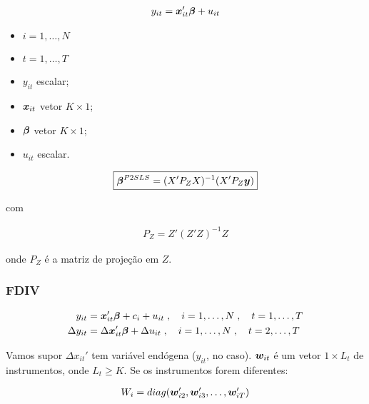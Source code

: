 \documentclass[11pt, oneside, a4paper, article]{article}
\numberwithin{equation}{section}
\begin{document}
\begin{description}
\vspace{-1 em}
\begin{align*}
	y_{it} = \boldsymbol{x}_{it}' \boldsymbol{\beta} + u_{it}
\end{align*}

\begin{itemize}\itemsep0pt
\item $i = 1, \dots, N$
\item $t = 1, \dots, T$
\item $y_{it}$ escalar;
\item $\boldsymbol{x}_{it}$  vetor $K \times 1$;
\item $\boldsymbol{\beta}$ vetor $K \times 1$;
\item $u_{it}$ escalar.
\end{itemize}

\vspace{-1 em}
\begin{align*}
\boxed{
\boldsymbol{\beta}^{P2SLS} =  ( X' P_{Z} X )^{-1} ( X' P_{Z} \boldsymbol{y} ) }
\end{align*}

\noindent
com

\vspace{-1 em}
\begin{align*}
\boxed{P_{Z} = Z'(Z'Z)^{-1}Z }
\end{align*}

\noindent
onde
$P_{Z}$ é a matriz de projeção em $Z$.

\subsubsection{FDIV}

\vspace{-1 em}
\begin{align*}
y_{it} &= \boldsymbol{x}_{it}' \boldsymbol{\beta} + c_{i} + u_{it}
\; , \quad i = 1, \dots, N
\; , \quad t = 1, \dots, T
\\
\Delta y_{it} &= \Delta \boldsymbol{x}_{it}' \boldsymbol{\beta} + \Delta u_{it}
\; , \quad i = 1, \dots, N
\; , \quad t = 2, \dots, T
\end{align*}

Vamos supor $\Delta x_{it}'$ tem variável endógena ($y_{it}$, no caso).
$\boldsymbol{w}_{it}$ é um vetor $1 \times L_{t}$ de instrumentos, onde $L_{t} \geq K$.
Se os instrumentos forem diferentes:

\vspace{-1 em}
\begin{align*}
	W_{i} = diag( \boldsymbol{w}_{i2}', \boldsymbol{w}_{i3}', \dots, \boldsymbol{w}_{iT}')
\end{align*}


\end{description}
\end{document}
